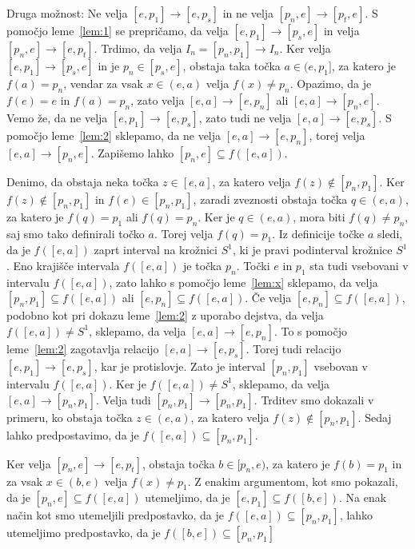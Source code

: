 \documentclass[../TG_magistrsko_delo_sections.tex]{subfiles}
\begin{document}
\begin{dokaz}
Druga možnost:
Ne velja $[e, p_1] \to [e, p_s]$ in ne velja $[p_n, e] \to [p_t, e]$. S pomočjo leme~\ref{lem:1} se prepričamo, da velja $[e, p_1] \to [p_s, e]$ in velja $[p_n, e] \to [e, p_t]$. Trdimo, da velja $I_n = [p_n, p_1] \to I_n$. Ker velja $[e, p_1] \to [p_s, e]$ in je $p_n \in [p_s, e]$, obstaja taka točka $a \in (e, p_1]$, za katero je $f(a) = p_n$, vendar za vsak $x \in (e, a)$ velja $f(x) \neq p_n$. Opazimo, da je $f(e) = e$ in $f(a) = p_n$, zato velja $[e, a] \to [e, p_n]$ ali $[e, a] \to [p_n, e]$. Vemo že, da ne velja $[e, p_1] \to [e, p_s]$, zato tudi ne velja $[e, a] \to [e, p_s]$. S pomočjo leme~\ref{lem:2} sklepamo, da ne velja $[e, a] \to [e, p_n]$, torej velja $[e, a] \to [p_n, e]$. Zapišemo lahko $[p_n, e] \subseteq f([e, a])$.

Denimo, da obstaja neka točka $z \in [e, a]$, za katero velja $f(z) \notin [p_n, p_1]$. Ker $f(z) \notin [p_n, p_1]$ in $f(e) \in [p_n, p_1]$, zaradi zveznosti obstaja točka $q \in (e, a)$, za katero je $f(q) = p_1$ ali $f(q)=p_n$. Ker je $q \in (e, a)$, mora biti $f(q) \neq p_n$, saj smo tako definirali točko $a$. Torej velja $f(q) = p_1$. Iz definicije točke $a$ sledi, da je $f([e, a])$ zaprt interval na krožnici $S^1$, ki je pravi podinterval krožnice $S^1$. Eno krajišče intervala $f([e, a])$ je točka $p_n$. Točki $e$ in $p_1$ sta tudi vsebovani v intervalu $f([e, a])$, zato lahko s pomočjo leme~\ref{lem:x} sklepamo, da velja $[p_n, p_1] \subseteq f([e, a])$ ali $[e, p_n] \subseteq f([e, a])$. Če velja $[e, p_n] \subseteq f([e, a])$, podobno kot pri dokazu leme~\ref{lem:2} z uporabo dejstva, da velja $f([e, a]) \neq S^1$, sklepamo, da velja $[e, a] \to [e, p_n]$. To s pomočjo leme~\ref{lem:2} zagotavlja relacijo $[e, a] \to [e, p_s]$. Torej tudi relacijo $[e, p_1] \to [e, p_s]$, kar je protislovje. Zato je interval $[p_n, p_1]$ vsebovan v intervalu $f([e, a])$. Ker je $f([e, a]) \neq S^1$, sklepamo, da velja $[e, a] \to [p_n, p_1]$. Velja tudi $[p_n, p_1] \to [p_n, p_1]$.
Trditev smo dokazali v primeru, ko obstaja točka $z \in (e, a)$, za katero velja $f(z) \notin [p_n, p_1]$. Sedaj lahko predpostavimo, da je $f([e, a]) \subseteq [p_n, p_1]$. 

Ker velja $[p_n, e] \to [e, p_t]$, obstaja točka $b \in [p_n, e)$, za katero je $f(b)=p_1$ in za vsak $x \in (b, e)$ velja $f(x) \neq p_1$. Z enakim argumentom, kot smo pokazali, da je $[p_n, e] \subseteq f([e, a])$ utemeljimo, da je $[e, p_1] \subseteq f([b, e])$. Na enak način kot smo utemeljili predpostavko, da je $f([e, a]) \subseteq [p_n, p_1]$, lahko utemeljimo predpostavko, da je $f([b, e]) \subseteq [p_n, p_1]$


\end{dokaz}
\end{document}
